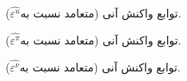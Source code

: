  
\begin{figure}[H]
\centering 

\caption{ توابع واکنش آنی (متعامد نسبت به$ \hat{\varepsilon^{u}}   $).}
\label{Fig:IRF:e_u}
\end{figure}
 
\begin{figure}[H]
\centering 

\caption{ توابع واکنش آنی (متعامد نسبت به$ \hat{\varepsilon^{\pi}} $).}
\label{Fig:IRF:e_pi}
\end{figure}
 
\begin{figure}[H]
\centering 

\caption{ توابع واکنش آنی (متعامد نسبت به$ \hat{\varepsilon^{\nu}} $).}
\label{Fig:IRF:e_nu}
\end{figure}
 
 
